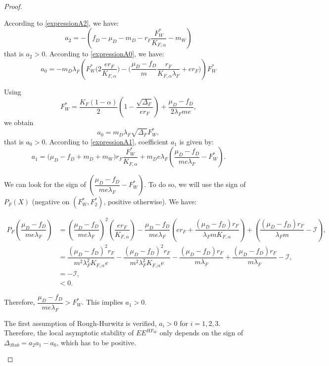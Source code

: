 \documentclass{article}
\newcommand{\lfw}{\lambda_{F}}
\newcommand{\lfw}{\lambda_{F}}
\newcommand{\cI}{\mathcal{I}}
\begin{document}
\begin{proof}
\begin{itemize}
According to \eqref{expressionA2}, we have:
\begin{equation*}
a_2 = -(f_D - \mu_D - m_D - r_F \dfrac{F_W^*}{K_{F, \alpha}} - m_W)
\end{equation*}
that is $a_2>0$. According to \eqref{expressionA0}, we have:
\begin{equation*}
a_0 = - m_D \lfw \left( F_W^* \Big(2 \dfrac{e r_F}{K_{F, \alpha}} \Big) - \Big(\dfrac{\mu_D - f_D}{m} \dfrac{r_F}{K_{F, \alpha} \lfw} + er_F \Big) \right) F_W^*
\end{equation*}

Using
\begin{equation*}
F_W^* = \dfrac{K_F(1-\alpha)}{2}\left(1 - \dfrac{\sqrt{\Delta_F}}{er_F}\right) + \dfrac{\mu_D - f_D}{2\lfw m e},
\end{equation*}
we obtain
\begin{equation*}
a_0 = m_D \lfw \sqrt{\Delta_F}  F^*_{W},
\end{equation*}
that is $a_0>0$. According to \eqref{expressionA1}, coefficient $a_1$ is given by:
\begin{equation*}
a_1 = \big( \mu_D -f_D + m_D + m_W) r_F \dfrac{F^*_W}{K_{F, \alpha}}   + m_D e\lfw   \left(\dfrac{\mu_D - f_D}{m e\lfw} - F^*_W \right).
\end{equation*}

We can look for the sign of $\left(\dfrac{\mu_D -f_D}{m e\lfw} - F^*_{W}\right)$. To do so, we will use the sign of $P_F(X)$ (negative on $(F^*_W, F^*_2)$, positive otherwise). We have:

\begin{align*}
P_F \left(\dfrac{\mu_D-f_D}{m e\lfw} \right) &= \left(\dfrac{\mu_D-f_D}{m e\lfw} \right)^2 \left(\dfrac{er_F}{K_{F, \alpha}} \right) - \dfrac{\mu_D-f_D}{m e\lfw} \left(er_F + \dfrac{(\mu_D -f_D) r_F}{\lfw m K_{F, \alpha}} \right) + \left(\dfrac{(\mu_D-f_D) r_F}{\lfw m} - \cI\right), \\
&= \dfrac{(\mu_D-f_D)^2 r_F}{m^2 \lfw^2 K_{F, \alpha} e} - \dfrac{(\mu_D-f_D)^2 r_F}{m^2 \lfw^2 K_{F, \alpha} e} - \dfrac{(\mu_D-f_D) r_F}{m \lfw} + \dfrac{(\mu_D-f_D) r_F}{m \lfw} - \cI, \\
&= - \cI,\\
& < 0.
\end{align*}

Therefore, $\dfrac{\mu_D - f_D}{m e\lfw} > F^*_{W}$. This implies $a_1 > 0$.

The first assumption of Rough-Hurwitz is verified, $a_i > 0$ for $i=1,2,3$. Therefore, the local asymptotic stability of $EE^{HF_W}$ only depends on the sign of $\Delta_{Stab}= a_2 a_1 - a_0$, which has to be positive.

\end{itemize}





\end{proof}
\end{document}
